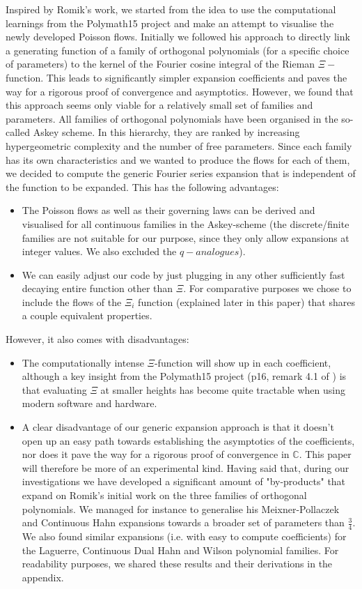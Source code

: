 \documentclass[a4paper,11pt,twoside]{amsart}
\begin{document}
Inspired by Romik's work, we started from the idea to use the computational learnings from the Polymath15 project and make an attempt to visualise the newly developed Poisson flows. Initially we followed his approach to directly link a generating function of a family of orthogonal polynomials (for a specific choice of parameters) to the kernel of the Fourier cosine integral of the Rieman $\Xi-$function. This leads to significantly simpler expansion coefficients and paves the way for a rigorous proof of convergence and asymptotics. However, we found that this approach seems only viable for a relatively small set of families and parameters. All families of orthogonal polynomials have been organised in the so-called Askey scheme. In this hierarchy, they are ranked by increasing hypergeometric complexity and the number of free parameters. Since each family has its own characteristics and we wanted to produce the flows for each of them, we decided to compute the generic Fourier series expansion that is independent of the function to be expanded. This has the following advantages: 
\begin{itemize}
\item The Poisson flows as well as their governing laws can be derived and visualised for all continuous families in the Askey-scheme (the discrete/finite families are not suitable for our purpose, since they only allow expansions at integer values. We also excluded the $q-analogues$).
\item We can easily adjust our code by just plugging in any other sufficiently fast decaying entire function other than $\Xi$. For comparative purposes we chose to include the flows of the $\Xi_i$ function (explained later in this paper) that shares a couple equivalent properties. 
\end{itemize}
However, it also comes with disadvantages:
\begin{itemize}
\item The computationally intense $\Xi$-function will show up in each coefficient, although a key insight from the Polymath15 project (p16, remark 4.1 of \cite{pol}) is that evaluating $\Xi$ at smaller heights has become quite tractable when using modern software and hardware.
\item A clear disadvantage of our generic expansion approach is that it doesn't open up an easy path towards establishing the asymptotics of the coefficients, nor does it pave the way for a rigorous proof of convergence in $\mathbb{C}$. This paper will therefore be more of an experimental kind. Having said that, during our investigations we have developed a significant amount of "by-products" that expand on Romik's initial work on the three families of orthogonal polynomials. We managed for instance to generalise his Meixner-Pollaczek and Continuous Hahn expansions towards a broader set of parameters than $\frac34$. We also found similar expansions (i.e. with easy to compute coefficients) for the Laguerre, Continuous Dual Hahn and Wilson polynomial families. For readability purposes, we shared these results and their derivations in the appendix.  
\end{itemize}
\end{document}
